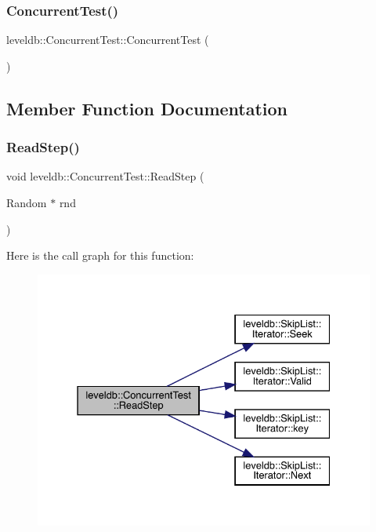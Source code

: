\subsubsection{\texorpdfstring{ConcurrentTest()}{ConcurrentTest()}}
{\footnotesize\ttfamily leveldb\+::\+Concurrent\+Test\+::\+Concurrent\+Test (\begin{DoxyParamCaption}{ }\end{DoxyParamCaption})\hspace{0.3cm}{\ttfamily [inline]}}



\subsection{Member Function Documentation}
\mbox{\label{classleveldb_1_1_concurrent_test_a9dcaf11ec747ad37150526f891627c50}} 
\subsubsection{\texorpdfstring{ReadStep()}{ReadStep()}}
{\footnotesize\ttfamily void leveldb\+::\+Concurrent\+Test\+::\+Read\+Step (\begin{DoxyParamCaption}\item[{Random $\ast$}]{rnd }\end{DoxyParamCaption})\hspace{0.3cm}{\ttfamily [inline]}}

Here is the call graph for this function\+:
\nopagebreak
\begin{figure}[H]
\begin{center}
\leavevmode
\includegraphics[width=331pt]{classleveldb_1_1_concurrent_test_a9dcaf11ec747ad37150526f891627c50_cgraph}
\end{center}
\end{figure}
\mbox{\label{classleveldb_1_1_concurrent_test_a43dc8afb9124c364d6e97dc3d421131f}} 
